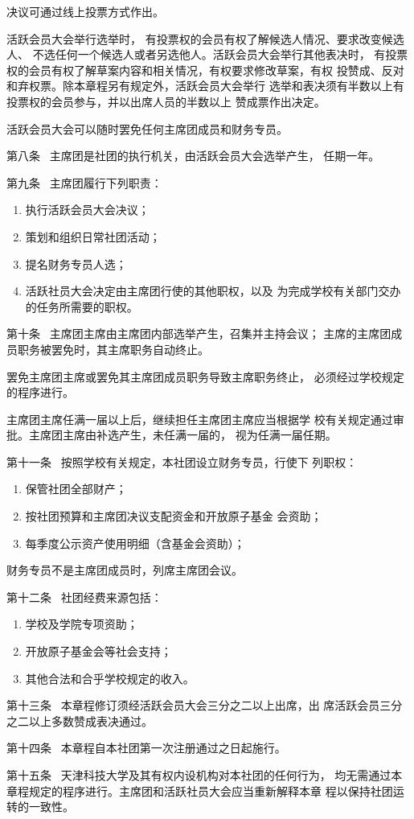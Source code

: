 \documentclass{gbt9704}
\begin{document}
决议可通过线上投票方式作出。

活跃会员大会举行选举时，
有投票权的会员有权了解候选人情况、要求改变候选人、
不选任何一个候选人或者另选他人。活跃会员大会举行其他表决时，
有投票权的会员有权了解草案内容和相关情况，有权要求修改草案，有权
投赞成、反对和弃权票。除本章程另有规定外，活跃会员大会举行
选举和表决须有半数以上有投票权的会员参与，并以出席人员的半数以上
赞成票作出决定。


活跃会员大会可以随时罢免任何主席团成员和财务专员。


第八条~ 主席团是社团的执行机关，由活跃会员大会选举产生，
任期一年。


第九条~ 主席团履行下列职责：
\begin{enumerate}
    \item 执行活跃会员大会决议；
    \item 策划和组织日常社团活动；
    \item 提名财务专员人选；
    \item 活跃社员大会决定由主席团行使的其他职权，以及
    为完成学校有关部门交办的任务所需要的职权。
\end{enumerate}


第十条~ 主席团主席由主席团内部选举产生，召集并主持会议；
主席的主席团成员职务被罢免时，其主席职务自动终止。

罢免主席团主席或罢免其主席团成员职务导致主席职务终止，
必须经过学校规定的程序进行。

主席团主席任满一届以上后，继续担任主席团主席应当根据学
校有关规定通过审批。主席团主席由补选产生，未任满一届的，
视为任满一届任期。

第十一条~ 按照学校有关规定，本社团设立财务专员，行使下
列职权：
\begin{enumerate}
    \item 保管社团全部财产；
    \item 按社团预算和主席团决议支配资金和开放原子基金
    会资助；
    \item 每季度公示资产使用明细（含基金会资助）；
\end{enumerate}


财务专员不是主席团成员时，列席主席团会议。


第十二条~ 社团经费来源包括：
\begin{enumerate}
    \item 学校及学院专项资助；
    \item 开放原子基金会等社会支持；
    \item 其他合法和合乎学校规定的收入。
\end{enumerate}


第十三条~ 本章程修订须经活跃会员大会三分之二以上出席，出
席活跃会员三分之二以上多数赞成表决通过。


第十四条~ 本章程自本社团第一次注册通过之日起施行。

第十五条~ 天津科技大学及其有权内设机构对本社团的任何行为，
均无需通过本
章程规定的程序进行。主席团和活跃社员大会应当重新解释本章
程以保持社团运转的一致性。
\end{document}
